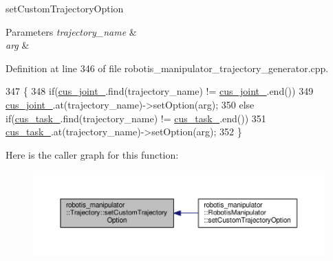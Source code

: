 set\+Custom\+Trajectory\+Option 


\begin{DoxyParams}{Parameters}
{\em trajectory\+\_\+name} & \\
\hline
{\em arg} & \\
\hline
\end{DoxyParams}


Definition at line 346 of file robotis\+\_\+manipulator\+\_\+trajectory\+\_\+generator.\+cpp.


\begin{DoxyCode}
347 \{
348   \textcolor{keywordflow}{if}(\hyperlink{classrobotis__manipulator_1_1_trajectory_a4424c07ba6cdfb08ca84fff0e2284f67}{cus\_joint\_}.find(trajectory\_name) != \hyperlink{classrobotis__manipulator_1_1_trajectory_a4424c07ba6cdfb08ca84fff0e2284f67}{cus\_joint\_}.end())
349     \hyperlink{classrobotis__manipulator_1_1_trajectory_a4424c07ba6cdfb08ca84fff0e2284f67}{cus\_joint\_}.at(trajectory\_name)->setOption(arg);
350   \textcolor{keywordflow}{else} \textcolor{keywordflow}{if}(\hyperlink{classrobotis__manipulator_1_1_trajectory_a1b02b691bf591629f4abf8478c437216}{cus\_task\_}.find(trajectory\_name) != \hyperlink{classrobotis__manipulator_1_1_trajectory_a1b02b691bf591629f4abf8478c437216}{cus\_task\_}.end())
351     \hyperlink{classrobotis__manipulator_1_1_trajectory_a1b02b691bf591629f4abf8478c437216}{cus\_task\_}.at(trajectory\_name)->setOption(arg);
352 \}
\end{DoxyCode}


Here is the caller graph for this function\+:\nopagebreak
\begin{figure}[H]
\begin{center}
\leavevmode
\includegraphics[width=350pt]{classrobotis__manipulator_1_1_trajectory_a9376519929c9ac310590f92784950ed3_icgraph}
\end{center}
\end{figure}


